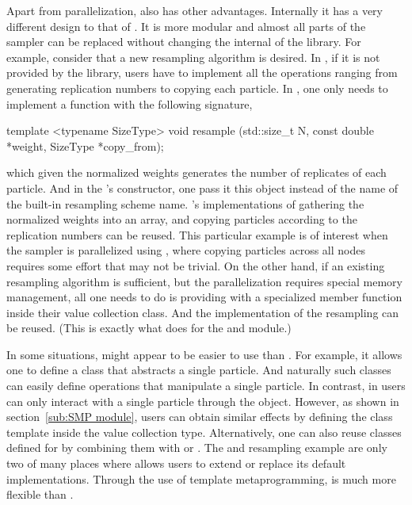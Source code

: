 \documentclass[11pt, bib, hyper, mint, minted=cache]{marticle}
\begin{document}
Apart from parallelization, \vsmc also has other advantages. Internally it has
a very different design to that of \lsmctc. It is more modular and almost all
parts of the sampler can be replaced without changing the internal of the
library. For example, consider that a new resampling algorithm is desired. In
\lsmctc, if it is not provided by the library, users have to implement all the
operations ranging from generating replication numbers to copying each
particle. In \vsmc, one only needs to implement a function with the following
signature,
\begin{cppcode}
template <typename SizeType>
void resample (std::size_t N, const double *weight, SizeType *copy_from);
\end{cppcode}
which given the normalized weights generates the number of replicates of each
particle. And in the 's constructor, one pass it this
object instead of the name of the built-in resampling scheme name. \vsmc's
implementations of gathering the normalized weights into an array, and copying
particles according to the replication numbers can be reused. This particular
example is of interest when the sampler is parallelized using \lmpi, where
copying particles across all nodes requires some effort that may not be
trivial. On the other hand, if an existing resampling algorithm is sufficient,
but the parallelization requires special memory management, all one needs to
do is providing \vsmc with a specialized  member function
inside their value collection class. And the implementation of the resampling
can be reused. (This is exactly what \vsmc does for the \lopencl and \lmpi
module.)

In some situations, \lsmctc might appear to be easier to use than \vsmc. For
example, it allows one to define a class that abstracts a single particle. And
naturally such classes can easily define operations that manipulate a single
particle. In contrast, in \vsmc users can only interact with a single particle
through the  object. However, as shown in
section~\ref{sub:SMP module}, users can obtain similar effects by defining the
 class template inside the value collection
type. Alternatively, one can also reuse classes defined for \lsmctc by
combining them with  or . The
 and resampling example are only two of many
places where \vsmc allows users to extend or replace its default
implementations. Through the use of template metaprogramming, \vsmc is much
more flexible than \lsmctc.
\end{document}
